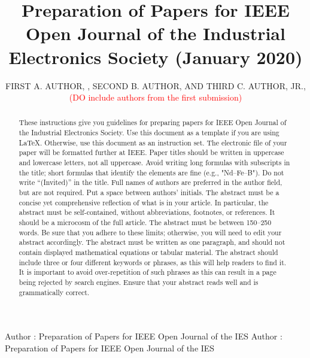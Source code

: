 \documentclass{ieeeojies}
\begin{document}
\title{Preparation of Papers for IEEE Open Journal of the Industrial Electronics Society (January 2020)}
\author{\uppercase{First A. Author}, ,
\uppercase{Second B. Author, and Third C. Author,
Jr}.,
 \textcolor{red}{(DO include authors from the first submission)}}
\address[1]{National Institute of Standards and 
Technology, Boulder, CO 80305 USA (e-mail: author@boulder.nist.gov)}
\address[2]{Department of Physics, Colorado State University, Fort Collins, 
CO 80523 USA (e-mail: author@lamar.colostate.edu)}
\address[3]{Electrical Engineering Department, University of Colorado, Boulder, CO 
80309 USA}

\markboth
{Author \headeretal: Preparation of Papers for IEEE Open Journal of the IES}
{Author \headeretal: Preparation of Papers for IEEE Open Journal of the IES}


\begin{abstract}
These instructions give you guidelines for preparing papers for 
IEEE Open Journal of the Industrial Electronics Society. Use this document as a template if you are 
using \LaTeX. Otherwise, use this document as an 
instruction set. The electronic file of your paper will be formatted further 
at IEEE. Paper titles should be written in uppercase and lowercase letters, 
not all uppercase. Avoid writing long formulas with subscripts in the title; 
short formulas that identify the elements are fine (e.g., "Nd--Fe--B"). Do 
not write ``(Invited)'' in the title. Full names of authors are preferred in 
the author field, but are not required. Put a space between authors' 
initials. The abstract must be a concise yet comprehensive reflection of 
what is in your article. In particular, the abstract must be self-contained, 
without abbreviations, footnotes, or references. It should be a microcosm of 
the full article. The abstract must be between 150--250 words. Be sure that 
you adhere to these limits; otherwise, you will need to edit your abstract 
accordingly. The abstract must be written as one paragraph, and should not 
contain displayed mathematical equations or tabular material. The abstract 
should include three or four different keywords or phrases, as this will 
help readers to find it. It is important to avoid over-repetition of such 
phrases as this can result in a page being rejected by search engines. 
Ensure that your abstract reads well and is grammatically correct.
\end{abstract}
\end{document}
